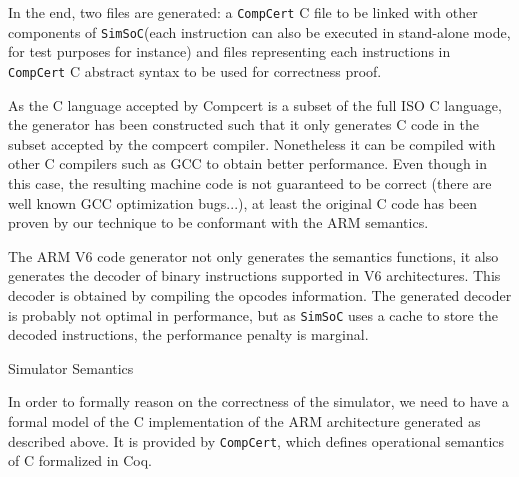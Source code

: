 \documentclass[twocolumn]{article}
\makeatletter
\def\subsection{\@startsection {subsection}{2}{\z@}{16pt plus 2pt minus 2pt}
{6pt plus 2pt minus 2pt}{\normalsize\sl
\edef\@svsec{\thesubsection.\ }}}
\def\thesubsection{\Alph{subsection}}
\newcommand{\compcert}{\texttt{CompCert}\xspace}
\newcommand{\simsoc}{\texttt{SimSoC}\xspace}
\makeatother
\begin{document}
In the end, two files are generated: a \compcert C file to be linked
with other components of \simsoc (each instruction can also be
executed in stand-alone mode, for test purposes for instance) and
files representing each instructions in \compcert C abstract syntax to
be used for correctness proof.

As the C language accepted by Compcert is a subset of the full ISO C
language, the generator has been constructed such that it only
generates C code in the subset accepted by the compcert compiler.
Nonetheless it can be compiled with other C compilers such as GCC
to obtain better performance. Even though in this case, the resulting
machine code is not guaranteed to be correct (there are well known
GCC optimization bugs...), at least the original C code has been
proven by our technique to be conformant with the ARM semantics.

The ARM V6 code generator not only generates the semantics functions,
it also generates the decoder of binary instructions supported in V6
architectures. This decoder is obtained by compiling the opcodes
information. The generated decoder is probably not optimal in
performance, but as \simsoc uses a cache to store the decoded
instructions, the performance penalty is marginal.

\subsection{Simulator Semantics}

In order to formally reason on the correctness of the simulator, we
need to have a formal model of the C implementation of the ARM
architecture generated as described above.  It is provided by \compcert,
which defines operational semantics of C formalized in Coq.
\end{document}
